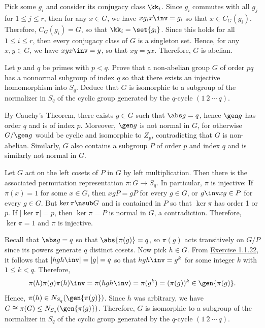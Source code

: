 \begin{sol}
	Pick some $g_i$ and consider its conjugacy class $\kk_i$. Since $g_i$ commutes with all $g_j$ for $1 \leq j \leq r$, then for any $x \in G$, we have $xg_ix\inv = g_i$ so that $x \in C_G(g_i)$. Therefore, $C_G(g_i) = G$, so that $\kk_i = \set{g_i}$. Since this holds for all $1 \leq i \leq r$, then every conjugacy class of $G$ is a singleton set. Hence, for any $x, y \in G$, we have $xyx\inv = y$, so that $xy = yx$. Therefore, $G$ is abelian.
\end{sol}

\begin{exercise}
	Let $p$ and $q$ be primes with $p < q$. Prove that a non-abelian group $G$ of order $pq$ has a nonnormal subgroup of index $q$ so that there exists an injective homomorphism into $S_q$. Deduce that $G$ is isomorphic to a subgroup of the normalizer in $S_q$ of the cyclic group generated by the $q$-cycle $(1\ 2\ \cdots\ q)$.
\end{exercise}

\begin{sol}
	By Cauchy's Theorem, there exists $g \in G$ such that $\abs g = q$, hence $\gen g$ has order $q$ and is of index $p$. Moreover, $\gen g$ is not normal in $G$, for otherwise $G/\gen g$ would be cyclic and isomorphic to $Z_p$, contradicting that $G$ is non-abelian. Similarly, $G$ also contains a subgroup $P$ of order $p$ and index $q$ and is similarly not normal in $G$.

	Let $G$ act on the left cosets of $P$ in $G$ by left multiplication. Then there is the associated permutation representation $\pi : G \to S_q$. In particular, $\pi$ is injective: If $\pi(x) = 1$ for some $x \in G$, then $xgP = gP$ for every $g \in G$, or $g\inv xg \in P$ for every $g \in G$. But $\ker\pi \nsub G$ and is contained in $P$ so that $\ker\pi$ has order 1 or $p$. If $|\ker\pi| = p$, then $\ker\pi = P$ is normal in $G$, a contradiction. Therefore, $\ker\pi = 1$ and $\pi$ is injective.

	Recall that $\abs g = q$ so that $\abs{\pi(g)} = q$, so $\pi(g)$ acts transitively on $G/P$ since its powers generate $q$ distinct cosets. Now pick $h \in G$. From \hyperref[ex1.1.22]{Exercise 1.1.22}, it follows that $|hgh\inv| = |g| = q$ so that $hgh\inv = g^k$ for some integer $k$ with $1 \leq k < q$. Therefore,
	\[\pi(h)\pi(g)\pi(h)\inv = \pi(hgh\inv) = \pi(g^k) = (\pi(g))^k \in \gen{\pi(g)}.\]
	Hence, $\pi(h) \in N_{S_q}(\gen{\pi(g)})$. Since $h$ was arbitrary, we have $G \cong \pi(G) \leq N_{S_q}(\gen{\pi(g)})$. Therefore, $G$ is isomorphic to a subgroup of the normalizer in $S_q$ of the cyclic group generated by the $q$-cycle $(1\ 2\ \cdots\ q)$.
\end{sol}

